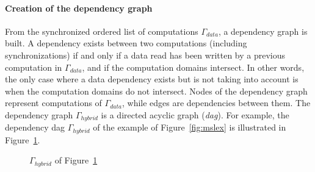 \paragraph{Creation of the dependency graph} From the synchronized ordered list of computations $\Gamma_{data}$, a dependency graph is built. A dependency exists between two computations (including synchronizations) if and only if a data read has been written by a previous computation in $\Gamma_{data}$, and if the computation domains intersect. In other words, the only case where a data dependency exists but is not taking into account is when the computation domains do not intersect. Nodes of the dependency graph represent computations of $\Gamma_{data}$, while edges are dependencies between them. The dependency graph $\Gamma_{hybrid}$ is a directed acyclic graph (\emph{dag}). For example, the dependency dag $\Gamma_{hybrid}$ of the example of Figure~\ref{fig:mslex} is illustrated in Figure~\ref{fig:hyb}.

\begin{figure}[h!]
\begin{center}
\caption{$\Gamma_{hybrid}$ of Figure~\ref{fig:hyb}}
\label{fig:hyb}
\end{center}
\end{figure}

